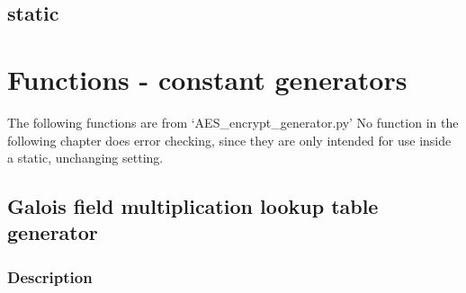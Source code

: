 \hypertarget{static}{%
\subsection{static}\label{static}}

\hypertarget{functions---constant-generators}{%
\section{Functions - constant
generators}\label{functions---constant-generators}}

The following functions are from `AES\_encrypt\_generator.py' No
function in the following chapter does error checking, since they are
only intended for use inside a static, unchanging setting.

\hypertarget{galois-field-multiplication-lookup-table-generator}{%
\subsection{Galois field multiplication lookup table
generator}\label{galois-field-multiplication-lookup-table-generator}}

\hypertarget{description}{%
\subsubsection{Description}\label{description}}

